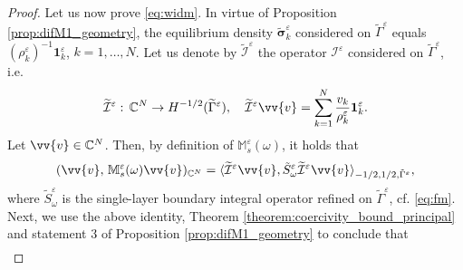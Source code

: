 \documentclass[]{article}
\numberwithin{equation}{section}
\numberwithin{theorem}{section}
\numberwithin{lemma}{section}
\numberwithin{corollary}{section}
\numberwithin{proposition}{section}
\numberwithin{definition}{section}
\newcommand{\by}{\boldsymbol{y}}
\newcommand{\bc}{\boldsymbol{c}}
\newcommand{\re}{\varepsilon}
\renewcommand{\vec}{\boldsymbol}
\begin{document}
\begin{proof}
		Let us now prove \eqref{eq:widm}. 
		In virtue of Proposition \ref{prop:difM1_geometry}, the equilibrium density $\widetilde{\vec{\sigma}}^{\re}_k$ considered on $\widetilde{\Gamma}^{\re}$ equals $(\rho^{\re}_k)^{-1} \vec{1}^{\re}_k$, $k=1,\ldots,N$. Let us denote by $\widetilde{\mathcal{I}}^{\re}$ the operator $\mathcal{I}^{\re}$ considered on $\widetilde{\Gamma}^{\re}$, i.e. 	
		\begin{align*}%
			\widetilde{\mathcal{I}}^{\re}: \, \mathbb{C}^N\rightarrow H^{-1/2}(\widetilde{\Gamma}^{\re}), \quad 	\widetilde{\mathcal{I}}^{\re}\vv{v}=\sum\limits_{k=1}^N \frac{v_{k}}{\rho^{\re}_{k}} \vec{1}^{\re}_{k}.
		\end{align*}
		Let $\vv{v}\in \mathbb{C}^N$. Then, by definition of $\mathbb{M}_s^{\re}(\omega)$, it holds that 
		\begin{align*}%
			(\vv{v}, \,\mathbb{M}^{\varepsilon}_{s}(\omega)\vv{v})_{\mathbb{C}^N}=\langle \widetilde{\mathcal{I}}^{\re}\vv{v}, \tilde{S}^{\re}_{\omega} \widetilde{\mathcal{I}}^{\re}\vv{v}\rangle_{-1/2, 1/2, \tilde{\Gamma}^{\re}},
		\end{align*}
		where $\tilde{S}^{\re}_{\omega}$ is the single-layer boundary integral operator refined on $\tilde{\Gamma}^{\re}$, cf. \eqref{eq:fm}. 
		Next, we use the above identity, Theorem \ref{theorem:coercivity_bound_principal} and statement 3 of Proposition \ref{prop:difM1_geometry} to conclude that 
		\begin{align*}%

\end{align*}
\end{proof}
\end{document}
